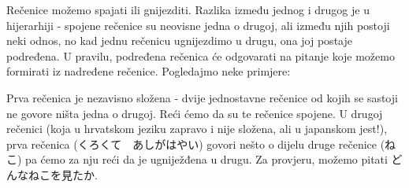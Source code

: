 
\author{Tomislav Mamić}

	
	
	Rečenice možemo spajati ili gnijezditi. Razlika između jednog i drugog je u hijerarhiji - spojene rečenice su neovisne jedna o drugoj, ali između njih postoji neki odnos, no kad jednu rečenicu ugnijezdimo u drugu, ona joj postaje podređena. U pravilu, podređena rečenica će odgovarati na pitanje koje možemo formirati iz nadređene rečenice. Pogledajmo neke primjere:
	
	\begin{reibun}
	\end{reibun}

	Prva rečenica je nezavisno složena - dvije jednostavne rečenice od kojih se sastoji ne govore ništa jedna o drugoj. Reći ćemo da su te rečenice spojene. U drugoj rečenici (koja u hrvatskom jeziku zapravo i nije složena, ali u japanskom jest!), prva rečenica (くろくて　あしがはやい) govori nešto o dijelu druge rečenice (ねこ) pa ćemo za nju reći da je ugniježđena u drugu. Za provjeru, možemo pitati どんなねこを見たか.
